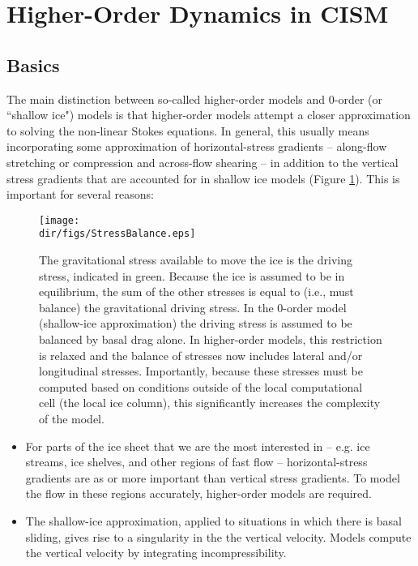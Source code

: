 
\section{Higher-Order Dynamics in CISM}
\label{sc:higher-order-into}

\subsection{Basics}
The main distinction between so-called higher-order models and 0-order (or ``shallow ice") models is that higher-order models attempt a closer approximation to solving the non-linear Stokes equations. In general, this usually means incorporating some approximation of horizontal-stress gradients -- along-flow stretching or compression and across-flow shearing -- in addition to the vertical stress gradients that are accounted for in shallow ice models (Figure \ref{fig:stressbalance}). This is important for several reasons:

\begin{figure}
  \begin{center}
    \texttt{[image: \\dir/figs/StressBalance.eps]}
  \end{center}
  \caption{The gravitational stress available to move the ice is the driving stress, indicated in green. Because the ice is assumed to be in equilibrium, the sum of the other stresses is equal to (i.e., must balance) the gravitational driving stress. In the 0-order model (shallow-ice approximation) the driving stress is assumed to be balanced by basal drag alone. In higher-order models, this restriction is relaxed and the balance of stresses now includes lateral and/or longitudinal stresses. Importantly, because these stresses must be computed based on conditions outside of the local computational cell (the local ice column), this significantly increases the complexity of the model.}
  \label{fig:stressbalance}
\end{figure} 

\begin{itemize}
\item For parts of the ice sheet that we are the most interested in -- e.g. ice streams, ice shelves, and other regions of fast flow -- horizontal-stress gradients are as or more important than vertical stress gradients. To model the flow in these regions accurately, higher-order models are required.

\item The shallow-ice approximation, applied to situations in which there is basal sliding, gives rise to a singularity in the the vertical velocity. Models compute the vertical velocity by integrating incompressibility.
\end{itemize}

